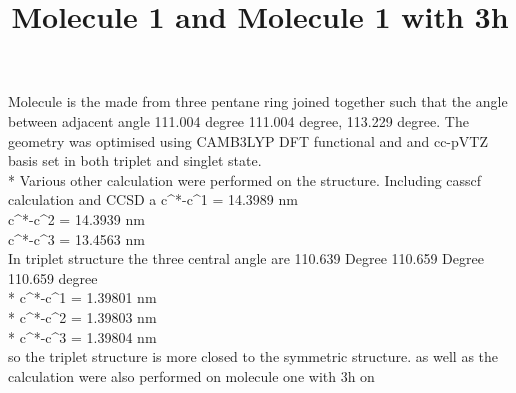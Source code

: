 \documentclass{article}
\title{Molecule 1 and Molecule 1 with 3h}
\begin{document}
Molecule is the made from three pentane ring joined together such that the angle between adjacent angle 111.004 degree 111.004 degree, 113.229 degree. The geometry was optimised using CAMB3LYP DFT functional and and cc-pVTZ basis set in both triplet and singlet state.\\*
Various other calculation were performed on the structure. Including casscf calculation and CCSD a
c^{*}-c^{1} = 14.3989 nm \\
c^{*}-c^{2} = 14.3939 nm\\
c^{*}-c^{3} = 13.4563 nm\\

In triplet structure the three central angle are 110.639 Degree 110.659 Degree 110.659 degree\\*
c^{*}-c^{1} = 1.39801 nm\\*
c^{*}-c^{2} = 1.39803 nm\\*
c^{*}-c^{3} = 1.39804 nm\\


so the triplet structure is more closed to the symmetric structure. 
as well as the  calculation were also performed on molecule one with 3h on 



\end{document}
